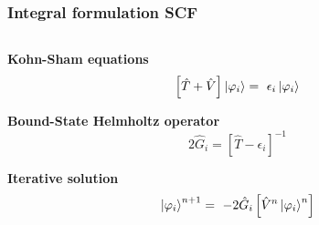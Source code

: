 \begin{frame}
    \frametitle{Integral formulation SCF}
    \begin{columns}
    \begin{column}[b]{0.5\textwidth}

    \centering
    \textbf{Kohn-Sham equations}
    \begin{equation}
        \nonumber
        \left[\hat{T} + \hat{V}\right]\ket{\orbital_i} =\ 
        \epsilon_i \ket{\orbital_i}
    \end{equation}

    \vspace{5mm}

    \textbf{Bound-State Helmholtz operator}
    \begin{equation}
        \nonumber
        2\hat{G}_i  = \left[\hat{T} - \epsilon_i\right]^{-1} 
    \end{equation}

    \vspace{5mm}

    \textbf{Iterative solution}
    \begin{equation}
        \nonumber
        \ket{\orbital_i}^{n+1} =\ -2\Helmholtz{\hat{V}^n\ket{\orbital_i}^n}
    \end{equation}

    \vspace{10mm}

    \end{column}


\end{columns}
\end{frame}
